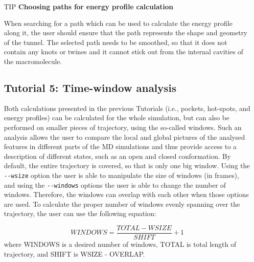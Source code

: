 \documentclass[9pt,tutorial, pubversion]{livecoms}
\begin{document}
\begin{Checklists}
\begin{checklist}{TIP}
\textbf{Choosing paths for energy profile calculation}

When searching for a path which can be used to calculate the energy profile along it, the user should ensure that the path represents the shape and geometry of the tunnel. The selected path needs to be smoothed, so that it does not contain any knots or twines and it cannot stick out from the internal cavities of the macromolecule.
\end{checklist}
\end{Checklists}

\subsection{Tutorial 5: Time-window analysis}

Both calculations presented in the previous Tutorials (i.e., pockets, hot-spots, and energy profiles) can be calculated for the whole simulation, but can also be performed on smaller pieces of trajectory, using the so-called windows. Such an analysis allows the user to compare the local and global pictures of the analysed features in different parts of the MD simulations and thus provide access to a description of different states, such as an open and closed conformation. By default, the entire trajectory is covered, so that is only one big window. Using the \texttt{-{}-wsize} option the user is able to manipulate the size of windows (in frames), and using the \texttt{-{}-windows} options the user is able to change the number of windows. Therefore, the windows can overlap with each other when those options are used.
To calculate the proper number of windows evenly spanning over the trajectory, the user can use the following equation:
 
\[ \displaystyle WINDOWS = \frac{TOTAL - WSIZE}{SHIFT} + 1 \]
where WINDOWS is a desired number of windows, TOTAL is total length of trajectory, and SHIFT is WSIZE - OVERLAP.
\end{document}
